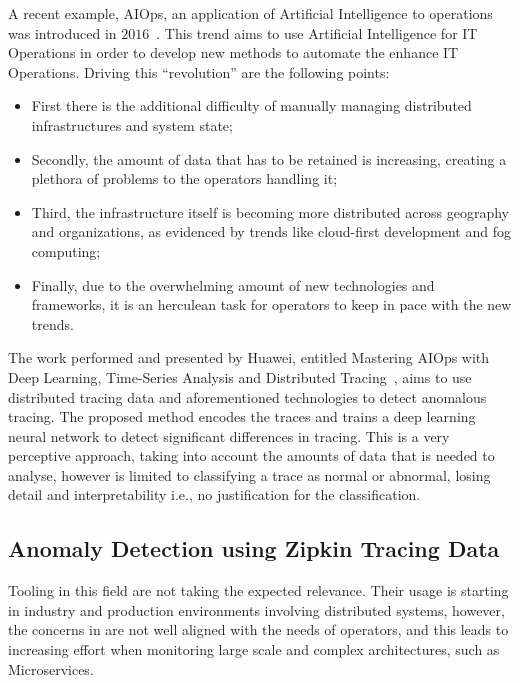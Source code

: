 A recent example, AIOps, an application of Artificial Intelligence to operations~\cite{rising_aiops} was introduced in $2016$~\cite{gartner_aiops}. This trend aims to use Artificial Intelligence for IT Operations in order to develop new methods to automate the enhance IT Operations. Driving this ``revolution'' are the following points:

\begin{itemize}
    \item First there is the additional difficulty of manually managing distributed infrastructures and system state;
    \item Secondly, the amount of data that has to be retained is increasing, creating a plethora of problems to the operators handling it;
    \item Third, the infrastructure itself is becoming more distributed across geography and organizations, as evidenced by trends like cloud-first development and fog computing;
    \item Finally, due to the overwhelming amount of new technologies and frameworks, it is an herculean task for operators to keep in pace with the new trends.
\end{itemize}

The work performed and presented by Huawei, entitled Mastering AIOps with Deep Learning, Time-Series Analysis and Distributed Tracing~\cite{mastering_aiops}, aims to use distributed tracing data and aforementioned technologies to detect anomalous tracing. The proposed method encodes the traces and trains a deep learning neural network to detect significant differences in tracing. This is a very perceptive approach, taking into account the amounts of data that is needed to analyse, however is limited to classifying a trace as normal or abnormal, losing detail and interpretability i.e., no justification for the classification.

\subsection{Anomaly Detection using Zipkin Tracing Data}
\label{subsec:anomaly_detection_using_zipkin_tracing_data}

Tooling in this field are not taking the expected relevance. Their usage is starting in industry and production environments involving distributed systems, however, the concerns in are not well aligned with the needs of operators, and this leads to increasing effort when monitoring large scale and complex architectures, such as Microservices.

